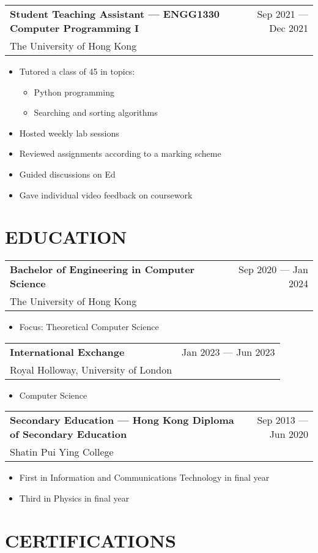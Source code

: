 \documentclass{article}
\makeatletter
\newcommand{\jobTitle}[3]{
    \vspace{0.3cm}
    \begin{tabular*}{1\textwidth}{||l@{\extracolsep{\fill}}r}
        \textbf{#1} & #2\\
        #3 &
    \end{tabular*}
}
\makeatother
\begin{document}
\jobTitle
{Student Teaching Assistant --- ENGG1330 Computer Programming I}
{Sep 2021 --- Dec 2021}
{The University of Hong Kong}
\begin{itemize}[leftmargin=1.2cm]
    \item Tutored a class of 45 in topics:
    \begin{itemize}
        \item Python programming
        \item Searching and sorting algorithms
    \end{itemize}
    \item Hosted weekly lab sessions
    \item Reviewed assignments according to a marking scheme
    \item Guided discussions on Ed
    \item Gave individual video feedback on coursework
\end{itemize}

\section{EDUCATION}

\jobTitle
{Bachelor of Engineering in Computer Science}
{Sep 2020 --- Jan 2024}
{The University of Hong Kong}
\begin{itemize}[leftmargin=1.2cm]
    \item Focus: Theoretical Computer Science
\end{itemize}

\jobTitle
{International Exchange}
{Jan 2023 --- Jun 2023}
{Royal Holloway, University of London}
\begin{itemize}[leftmargin=1.2cm]
    \item Computer Science
\end{itemize}

\jobTitle
{Secondary Education --- Hong Kong Diploma of Secondary Education}
{Sep 2013 --- Jun 2020}
{Shatin Pui Ying College}
\begin{itemize}[leftmargin=1.2cm]
    \item First in Information and Communications Technology in final year
    \item Third in Physics in final year
\end{itemize}

\section{CERTIFICATIONS}
\end{document}
